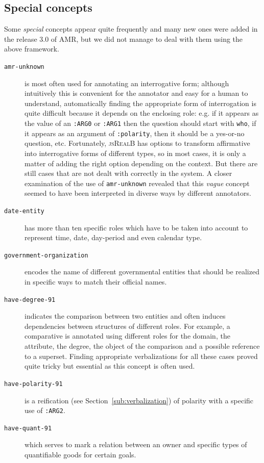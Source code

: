 \documentclass[12pt]{article}
\newcommand{\systeme}[1]{\textsc{#1}}
\newcommand{\jsr}{\systeme{jsRealB}}
\newcommand{\representation}[1]{\textsf{#1}}
\newcommand{\AMR}{\representation{AMR}}
\begin{document}
\subsection{Special concepts} %
\label{sub:special_concepts}
Some \emph{special} concepts appear quite frequently and many new ones were added in the release 3.0 of \AMR{}, but we did not manage to deal with them using the above framework.
\begin{description}
 \item[\texttt{amr-unknown}] is most often used for annotating an interrogative form; although intuitively this is convenient for the annotator and easy for a human to understand, automatically finding the appropriate form of interrogation is quite difficult because it depends on the enclosing role: e.g. if it appears as the value of an \texttt{:ARG0} or \texttt{:ARG1} then the question should start with \texttt{who}, if it appears as an argument of \texttt{:polarity}, then it should be a yes-or-no question, etc. Fortunately, \jsr{} has options to transform affirmative into interrogative forms of different types, so in most cases, it is only a matter of adding the right option depending on the context. But there are still cases that are not dealt with correctly in the system. A closer examination of the use of \texttt{amr-unknown} revealed that this \emph{vague} concept seemed to have been interpreted in diverse ways by different annotators.
 \item[\texttt{date-entity}] has more than ten specific roles which have to be taken into account to represent time, date, day-period and even calendar type.
 \item[\texttt{government-organization}] encodes the name of different governmental entities that should be realized in specific ways to match their official names.
 \item[\texttt{have-degree-91}] indicates the comparison between two entities and often induces dependencies between structures of different roles. For example, a comparative is annotated using different roles for the domain, the attribute, the degree, the object of the comparison and a possible reference to a superset. Finding appropriate verbalizations for all these cases proved quite tricky but essential as this concept is often used.
 \item[\texttt{have-polarity-91}] is a reification (see Section~\ref{sub:verbalization}) of polarity with a specific use of \texttt{:ARG2}.
 \item[\texttt{have-quant-91}] which serves to mark a relation between an owner and specific types of quantifiable goods for certain goals.

\end{description}
\end{document}
